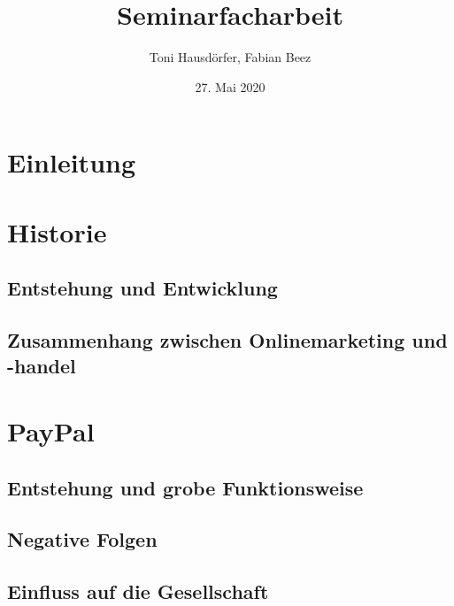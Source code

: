 \documentclass[a4paper, 12pt]{scrartcl}
\title{Seminarfacharbeit}
\author{Toni Hausdörfer, Fabian Beez}
\date{27. Mai 2020}
\begin{document}
    
    
    
    

    \tableofcontents 
        \newpage

    \section{Einleitung}
        
        \newpage
    
    
    
    \section{Historie}
            
        \subsection{Entstehung und Entwicklung}
            
        \subsection{Zusammenhang zwischen Onlinemarketing und -handel}
            
        \newpage
        
        
        
    \section{PayPal}
		
        \subsection{Entstehung und grobe Funktionsweise}
            
        \subsection{Negative Folgen}
            
        \subsection{Einfluss auf die Gesellschaft}
            
        \newpage
        
        
        
\end{document}
